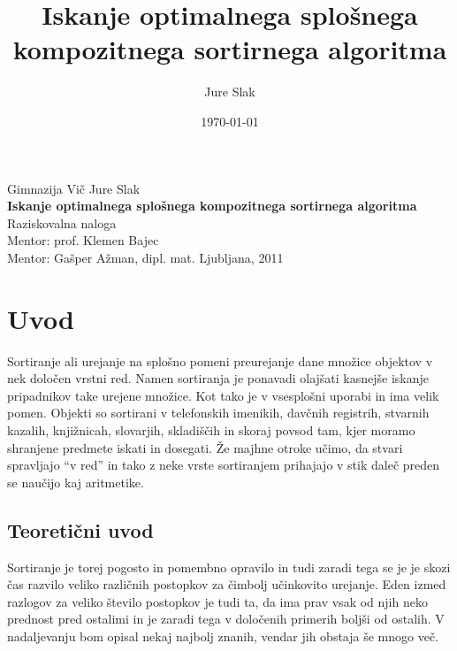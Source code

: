 \documentclass[a4paper,oneside,10pt]{article}
\title{Iskanje optimalnega splošnega kompozitnega sortirnega algoritma}
\author{Jure Slak}
\date{\today}
\begin{document}
\renewcommand{\listfigurename}{Kazalo slik} 
\renewcommand{\listalgorithmname}{Kazalo algoritmov}

\addto\captionsslovene { %
\renewcommand\bibname{} %
}
\renewcommand\refname{}


\thispagestyle{empty}

\begin{center}{\large
  Gimnazija Vič
  \vfill
  {\Large Jure Slak}\\[20mm]
  {\bf \huge Iskanje optimalnega splošnega kompozitnega sortirnega algoritma}\\[10mm]
  Raziskovalna naloga\\[1cm]
  Mentor: prof. Klemen Bajec \\[2mm]
  Mentor: Gašper Ažman, dipl. mat.}
  \vfill
  \vfill
  \large Ljubljana, 2011
\end{center}
\pagebreak

\thispagestyle{empty}
\tableofcontents
\pagebreak
\thispagestyle{empty}
\listoffigures
\pagebreak
\thispagestyle{empty}
\listofalgorithms
\pagebreak

\section{Uvod}
\label{chapter:uvod}

Sortiranje ali urejanje na splošno pomeni preurejanje dane množice objektov
v nek določen vrstni red.
Namen sortiranja je ponavadi olajšati kasnejše iskanje pripadnikov take urejene množice. Kot tako je
v vsesplošni uporabi in ima velik pomen. Objekti so sortirani v telefonskih imenikih,
davčnih registrih, stvarnih kazalih, knjižnicah, slovarjih, skladiščih in skoraj povsod tam,
kjer moramo shranjene predmete iskati in dosegati. Že majhne otroke učimo, da stvari spravljajo
``v red'' in tako z neke vrste sortiranjem prihajajo v stik daleč preden se naučijo kaj
aritmetike.

\subsection{Teoretični uvod}
\label{chapter:teoreticni}
Sortiranje je torej pogosto in pomembno opravilo in tudi zaradi tega se je je skozi čas
razvilo veliko različnih postopkov za čimbolj učinkovito urejanje. Eden izmed razlogov za
veliko število postopkov je tudi ta, da ima prav vsak od njih neko prednost pred ostalimi in je
zaradi tega v določenih primerih boljši od ostalih. V nadaljevanju bom opisal nekaj najbolj znanih, 
vendar jih obstaja še mnogo več. 
\end{document}
